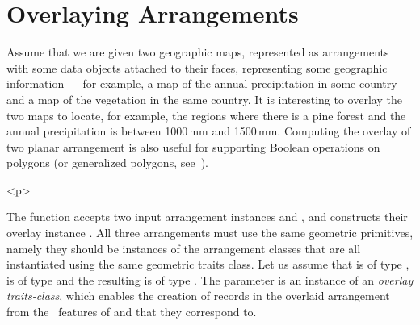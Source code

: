 
\section{Overlaying Arrangements}
\label{arr_sec:overlay}
%
Assume that we are given two geographic maps, represented as
arrangements with some data objects attached to their faces,
representing some geographic information --- for example, a map of
the annual precipitation in some country and a map of the vegetation
in the same country. It is interesting to overlay the two maps to
locate, for example, the regions where there is a pine forest and
the annual precipitation is between 1000\,mm and 1500\,mm. Computing
the overlay of two planar arrangement is also useful for supporting
Boolean operations on polygons (or generalized polygons,
see~\cite{behsms-cbcab-02}).

\begin{ccHtmlOnly}<p>\end{ccHtmlOnly}
The function  accepts
two input arrangement instances  and , and constructs
their overlay instance . All three arrangements must use the
same geometric primitives, namely they should be instances of the
arrangement classes that are all instantiated using the same geometric
traits class. Let us assume that  is of type
,  is of type
 and the resulting  is of type 
. The  parameter is
an instance of an {\em overlay traits-class}, which enables the creation of
 records in the overlaid arrangement from the \dcel\ features
of  and  that they correspond to.

